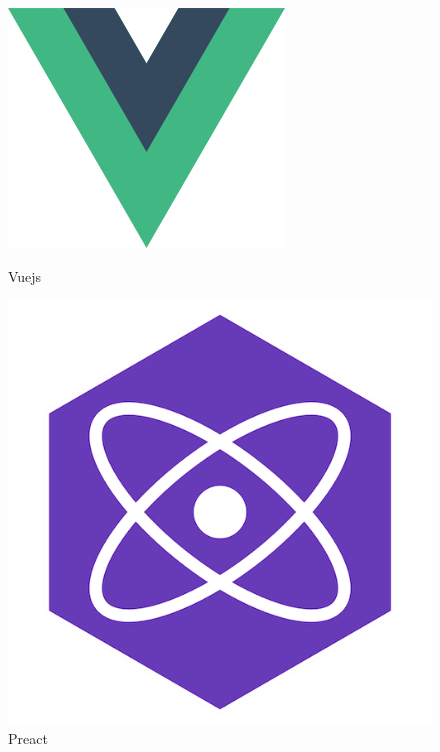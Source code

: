 \documentclass{article}
\begin{document}
\newpage
\begin{figure}[H] 
  \centering
  \begin{minipage}[l]{0.4\textwidth}  %
    \includegraphics[width=\textwidth,scale=0.5]{vuejs.png}
    \caption{Vuejs}
    \label{fig:Vuejs}
  \end{minipage}
  \hfill
  \begin{minipage}[c]{0.4\textwidth}
    \includegraphics[width=\textwidth,scale=0.5]{preact.png}
    \caption{Preact}
    \label{fig:Preact}
  \end{minipage}
\end{figure}
\end{document}
